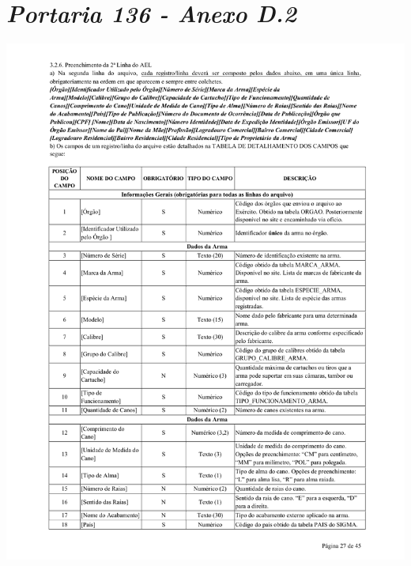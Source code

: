 \chapter{\textit{Portaria 136 - Anexo D.2}}
\label{sec:anexoA2}
\includegraphics[scale=0.8]{imagens/AnexoA2-AnexoD-portaria-136}

